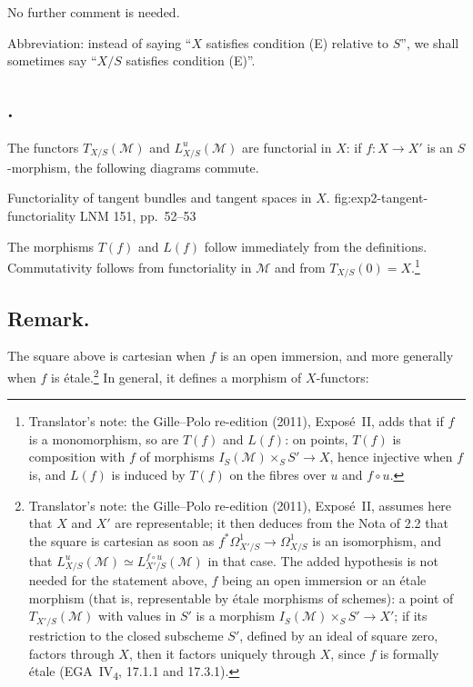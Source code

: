 No further comment is needed.

Abbreviation: instead of saying ``\(X\) satisfies condition (E) relative
to \(S\)'', we shall sometimes say ``\(X/S\) satisfies condition (E)''.

\subsection*{.}
The functors \(T_{X/S}(\mathcal M)\) and \(L^u_{X/S}(\mathcal M)\) are
functorial in \(X\): if \(f:X\to X'\) is an \(S\)-morphism, the
following diagrams commute.

  {Functoriality of tangent bundles and tangent spaces in \(X\).}
  {fig:exp2-tangent-functoriality}
  {LNM 151, pp.~52--53}

The morphisms \(T(f)\) and \(L(f)\) follow immediately from the
definitions. Commutativity follows from functoriality
in \(\mathcal M\) and from \(T_{X/S}(0)=X\).\footnote{Translator's note:
the Gille--Polo re-edition (2011), Expos\'e~II, adds that if \(f\) is a
monomorphism, so are \(T(f)\) and \(L(f)\): on points, \(T(f)\) is
composition with \(f\) of morphisms \(I_S(\mathcal M)\times_SS'\to X\),
hence injective when \(f\) is, and \(L(f)\) is induced by \(T(f)\) on the
fibres over \(u\) and \(f\circ u\).}

\subsection*{Remark.}
The square above is cartesian when \(f\) is an open immersion, and more
generally when \(f\) is \'etale.\footnote{Translator's note: the
Gille--Polo re-edition (2011), Expos\'e~II, assumes here that \(X\) and
\(X'\) are representable; it then deduces from the Nota of 2.2 that the
square is cartesian as soon as \(f^*\Omega^1_{X'/S}\to\Omega^1_{X/S}\) is an
isomorphism, and that \(L^u_{X/S}(\mathcal M)\simeq
L^{f\circ u}_{X'/S}(\mathcal M)\) in that case. The added hypothesis is not
needed for the statement above, \(f\) being an open immersion or an \'etale
morphism (that is, representable by \'etale morphisms of schemes): a point
of \(T_{X'/S}(\mathcal M)\) with values in \(S'\) is a morphism
\(I_S(\mathcal M)\times_SS'\to X'\); if its restriction to the closed
subscheme \(S'\), defined by an ideal of square zero, factors through \(X\),
then it factors uniquely through \(X\), since \(f\) is formally \'etale
(EGA~IV\textsubscript{4}, 17.1.1 and 17.3.1).} In general, it defines a morphism of
\(X\)-functors:

